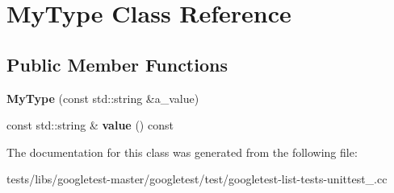 \hypertarget{classMyType}{}\section{My\+Type Class Reference}
\label{classMyType}
\subsection*{Public Member Functions}
\begin{DoxyCompactItemize}
\item 
\mbox{\label{classMyType_a74d6f29a06e298321a6e5f0b91b020e7}} 
{\bfseries My\+Type} (const std\+::string \&a\+\_\+value)
\item 
\mbox{\label{classMyType_a04eaace57f0ecd8ee8898defbdee31b4}} 
const std\+::string \& {\bfseries value} () const
\end{DoxyCompactItemize}


The documentation for this class was generated from the following file\+:\begin{DoxyCompactItemize}
\item 
tests/libs/googletest-\/master/googletest/test/googletest-\/list-\/tests-\/unittest\+\_\+.\+cc\end{DoxyCompactItemize}
